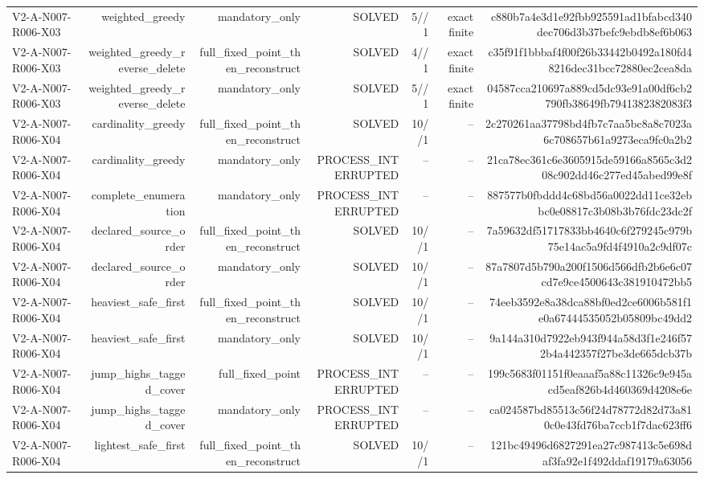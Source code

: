 {\begin{longtable}{lrrrrrr}
V2-A-N007-R006-X03 & weighted\_greedy & mandatory\_only & SOLVED & 5//1 & exact finite & c880b7a4e3d1e92fbb925591ad1bfabcd340dec706d3b37befc9ebdb8ef6b063 \\
V2-A-N007-R006-X03 & weighted\_greedy\_reverse\_delete & full\_fixed\_point\_then\_reconstruct & SOLVED & 4//1 & exact finite & c35f91f1bbbaf4f00f26b33442b0492a180fd48216dec31bcc72880ec2cea8da \\
V2-A-N007-R006-X03 & weighted\_greedy\_reverse\_delete & mandatory\_only & SOLVED & 5//1 & exact finite & 04587cca210697a889cd5dc93e91a00df6cb2790fb38649fb7941382382083f3 \\
V2-A-N007-R006-X04 & cardinality\_greedy & full\_fixed\_point\_then\_reconstruct & SOLVED & 10//1 & -- & 2c270261aa37798bd4fb7c7aa5bc8a8c7023a6c708657b61a9273eca9fc0a2b2 \\
V2-A-N007-R006-X04 & cardinality\_greedy & mandatory\_only & PROCESS\_INTERRUPTED & -- & -- & 21ca78ec361c6e3605915de59166a8565c3d208c902dd46c277ed45abed99e8f \\
V2-A-N007-R006-X04 & complete\_enumeration & mandatory\_only & PROCESS\_INTERRUPTED & -- & -- & 887577b0fbddd4c68bd56a0022dd11ce32ebbc0e08817c3b08b3b76fdc23dc2f \\
V2-A-N007-R006-X04 & declared\_source\_order & full\_fixed\_point\_then\_reconstruct & SOLVED & 10//1 & -- & 7a59632df51717833bb4640c6f279245c979b75e14ac5a9fd4f4910a2c9df07c \\
V2-A-N007-R006-X04 & declared\_source\_order & mandatory\_only & SOLVED & 10//1 & -- & 87a7807d5b790a200f1506d566dfb2b6e6c07cd7e9ce4500643c381910472bb5 \\
V2-A-N007-R006-X04 & heaviest\_safe\_first & full\_fixed\_point\_then\_reconstruct & SOLVED & 10//1 & -- & 74eeb3592e8a38dca88bf0ed2ce6006b581f1e0a67444535052b05809bc49dd2 \\
V2-A-N007-R006-X04 & heaviest\_safe\_first & mandatory\_only & SOLVED & 10//1 & -- & 9a144a310d7922eb943f944a58d3f1e246f572b4a442357f27be3de665dcb37b \\
V2-A-N007-R006-X04 & jump\_highs\_tagged\_cover & full\_fixed\_point & PROCESS\_INTERRUPTED & -- & -- & 199c5683f01151f0eaaaf5a88c11326c9e945acd5eaf826b4d460369d4208e6e \\
V2-A-N007-R006-X04 & jump\_highs\_tagged\_cover & mandatory\_only & PROCESS\_INTERRUPTED & -- & -- & ca024587bd85513c56f24d78772d82d73a810c0e43fd76ba7ccb1f7dac623ff6 \\
V2-A-N007-R006-X04 & lightest\_safe\_first & full\_fixed\_point\_then\_reconstruct & SOLVED & 10//1 & -- & 121bc49496d6827291ea27c987413c5e698daf3fa92e1f492ddaf19179a63056 \\

\end{longtable}}

